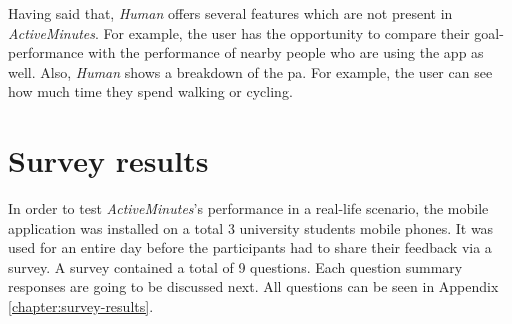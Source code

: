 Having said that, \textit{Human} offers several features which are not present in \textit{ActiveMinutes}. For example, the user has the opportunity to compare their goal-performance with the performance of nearby people who are using the app as well. Also, \textit{Human} shows a breakdown of the \gls{pa}. For example, the user can see how much time they spend walking or cycling. 

\section{Survey results}
In order to test \textit{ActiveMinutes}'s performance in a real-life scenario, the mobile application was installed on a total 3 university students mobile phones. It was used for an entire day before the participants had to share their feedback via a survey. A survey contained a total of 9 questions. Each question summary responses are going to be discussed next. All questions can be seen in Appendix \ref{chapter:survey-results}.


